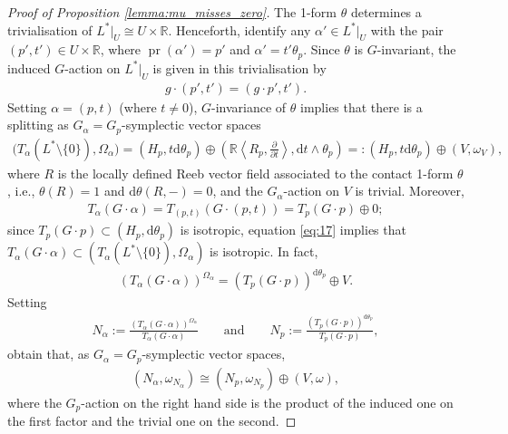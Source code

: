 \documentclass[10pt,a4paper]{amsart}
\numberwithin{equation}{section}
\newcommand{\de}{\mathrm{d}} %
\newcommand{\CM}{(M,H)} %
\newcommand{\SYM}{L^* \setminus \{0\}} %
\newcommand{\RR}{\mathbb{R}}
\begin{document}
\begin{proof}[Proof of Proposition \ref{lemma:mu_misses_zero}]
The 1-form $\theta$ determines a trivialisation of $L^*|_U \cong U \times \RR$. Henceforth, identify any $\alpha' \in L^*|_U$ with the pair $(p',t') \in U \times \RR$, where $\operatorname{pr} (\alpha' ) = p '$ and $\alpha' = t' \theta_p$. Since $\theta$ is $G$-invariant, the induced $G$-action on $L^*|_U$ is given in this trivialisation by
 \begin{gather*}
 g \cdot (p', t') = (g \cdot p', t').
 \end{gather*}
Setting $\alpha = (p,t)$ (where $t \neq 0$), $G$-invariance of $\theta$ implies that there is a splitting as $G_{\alpha} = G_p$-symplectic vector spaces
 \begin{gather*} %
 \big(T_{\alpha} ( \SYM ),\Omega_{\alpha}\big) = (H_p, t\de \theta_p ) \oplus \left(\RR \left\langle R_p,
 \frac{\partial}{\partial t} \right\rangle , \de t \wedge \theta_p\right)=: (H_p,t \de \theta_p) \oplus (V, \omega_V ),
 \end{gather*}
where $R$ is the locally def\/ined Reeb vector f\/ield associated to the contact 1-form $\theta$, i.e., $\theta(R) = 1$ and $\de \theta(R,-) = 0$, and the $G_{\alpha}$-action on $V$ is trivial. Moreover,
 \begin{gather} \label{eq:17}
 T_{\alpha} (G \cdot \alpha) = T_{(p,t)} (G \cdot (p,t) ) = T_p (G \cdot p ) \oplus 0;
 \end{gather}
since $T_{p} (G \cdot p) \subset (H_p, \de \theta_p)$ is isotropic, equation \eqref{eq:17} implies that $T_{\alpha} ( G \cdot \alpha ) \subset (T_{\alpha} ( \SYM ),\Omega_{\alpha})$ is isotropic. In fact,
 \begin{gather*}
(T_{\alpha} (G \cdot \alpha))^{\Omega_{\alpha}} = (T_{p} (G \cdot p ))^{\de \theta_p} \oplus V.
 \end{gather*}
Setting
 \begin{gather*}
 N_{\alpha}:= \frac{(T_{\alpha} (G \cdot \alpha))^{\Omega_{\alpha}}}{T_{\alpha} (G \cdot \alpha)}\qquad \text{and} \qquad N_p:= \frac{(T_{p} (G \cdot p))^{\de\theta_p}}{T_{p} (G \cdot p)},
 \end{gather*}
obtain that, as $G_{\alpha}=G_p$-symplectic vector spaces,
 \begin{gather} \label{eq:24}
(N_{\alpha}, \omega_{N_{\alpha}}) \cong (N_{p}, \omega_{N_{p}})\oplus (V,\omega),
 \end{gather}
where the $G_p$-action on the right hand side is the product of the induced one on the f\/irst factor and the trivial one on the second.


\end{proof}
\end{document}
